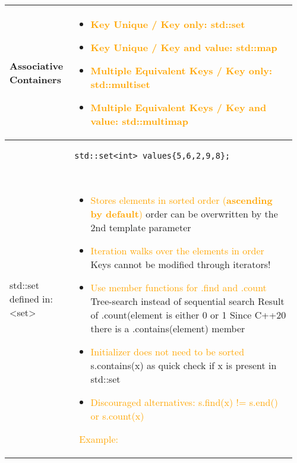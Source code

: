 \documentclass[main.tex,fontsize=8pt,paper=a4,paper=portrait,DIV=calc]{scrartcl}
\begin{document}
\begin{table}[ht!]
\begin{tabular}{|m{0.2\linewidth}|m{0.755\linewidth}|}
\hline
Associative Containers & 
\vspace{2mm}
\begin{itemize}
\item \textcolor{Orange}{Key Unique / Key only: std::set}
\item \textcolor{Orange}{Key Unique / Key and value: std::map}
\item \textcolor{Orange}{Multiple Equivalent Keys / Key only: std::multiset}
\item \textcolor{Orange}{Multiple Equivalent Keys / Key and value: std::multimap}
\vspace{-2mm}
\end{itemize}\\ 
\hline
std::set \newline 
defined in: <set> &
\begin{lstlisting}
std::set<int> values{5,6,2,9,8};
\end{lstlisting}
\, \newline
\begin{itemize}
\item \textcolor{orange}{Stores elements in sorted order (\textbf{ascending by default})}\newline
  order can be overwritten by the 2nd template parameter
\item \textcolor{orange}{Iteration walks over the elements in order}\newline
  Keys cannot be modified through iterators!
\item \textcolor{orange}{Use member functions for .find and .count}\newline
  Tree-search instead of sequential search\newline
  Result of .count(element is either 0 or 1\newline
  Since C++20 there is a .contains(element) member
\item \textcolor{orange}{Initializer does not need to be sorted}\newline
  s.contains(x) as quick check if x is present in std::set
\item \textcolor{orange}{Discouraged alternatives: s.find(x) != s.end() or s.count(x)}
\vspace{-2mm}
\end{itemize} 
\, \newline
\textcolor{orange}{Example:}\newline

\end{tabular}
\end{table}
\end{document}
